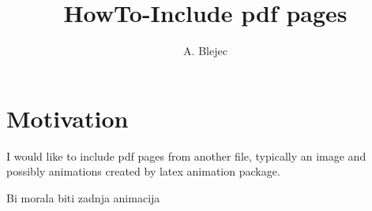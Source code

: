 \documentclass[a4paper,12pt]{article}
\begin{document}
\title{HowTo-Include pdf pages}
\author{A. Blejec}
%

\maketitle
\tableofcontents

\section{Motivation}

I would like to include pdf pages from another file, typically an image and possibly animations created by latex animation package.



Bi morala biti zadnja animacija



%
%

%

\clearpage
\end{document}
